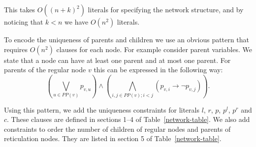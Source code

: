 \documentclass[runningheads, envcountsame, a4paper]{llncs}
\begin{document}
This takes $O((n + k)^2)$ literals for specifying the network structure, and by noticing that $k < n$ we have $O(n^2)$ literals.

To encode the uniqueness of parents and children we use an obvious pattern that requires $O(n^2)$ clauses for each node. For example consider 
parent variables. We state that a node can have at least one parent and at most one parent. For parents of the regular node $v$ this can be expressed 
in the following way: 
$$\left(\bigvee\limits_{u \in PP(v)} p_{v,u}\right) \wedge \left(\bigwedge\limits_{i, j \in PP(v);i < j} \left(p_{v,i} \rightarrow \neg p_{v,j}\right)\right).$$

Using this pattern, we add the uniqueness constraints for literals $l$, $r$, $p$, $p^l$, $p^r$ and $c$. 
These clauses are defined in sections 1--4 of Table~\ref{network-table}. 
We also add constraints to order the number of children of regular nodes and parents of reticulation nodes.
They are listed in section 5 of Table~\ref{network-table}.
\end{document}

